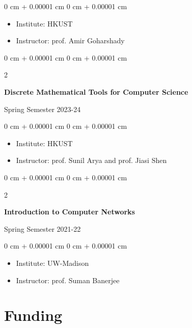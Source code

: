 \documentclass[10pt, letterpaper]{article}
\newenvironment{highlights}{
    \begin{itemize}[
        topsep=0.10 cm,
        parsep=0.10 cm,
        partopsep=0pt,
        itemsep=0pt,
        leftmargin=0 cm + 10pt
    ]
}{
    \end{itemize}
} %
\newenvironment{onecolentry}{
    \begin{adjustwidth}{
        0 cm + 0.00001 cm
    }{
        0 cm + 0.00001 cm
    }
}{
    \end{adjustwidth}
} %
\newenvironment{twocolentry}[2][]{
    \onecolentry
    \def\secondColumn{#2}
    \setcolumnwidth{\fill, 4.5 cm}
    \begin{paracol}{2}
}{
    \switchcolumn \raggedleft \secondColumn
    \end{paracol}
    \endonecolentry
} %
\begin{document}
            \vspace{0.10 cm}
            
            \begin{onecolentry}
            \begin{highlights}
                \item Institute: HKUST
                \item Instructor: prof. Amir Goharshady
            \end{highlights}
        \end{onecolentry}

        \begin{twocolentry}{
                Spring Semester 2023-24
            }
                \textbf{Discrete Mathematical Tools for Computer Science}
            \end{twocolentry}

            \vspace{0.10 cm}
            
            \begin{onecolentry}
            \begin{highlights}
                \item Institute: HKUST
                \item Instructor: prof. Sunil Arya and prof. Jiasi Shen
            \end{highlights}
        \end{onecolentry}

        \begin{twocolentry}{
                Spring Semester 2021-22
            }
                \textbf{Introduction to Computer Networks}
            \end{twocolentry}

            \vspace{0.10 cm}
            
            \begin{onecolentry}
            \begin{highlights}
                \item Institute: UW-Madison
                \item Instructor: prof. Suman Banerjee
            \end{highlights}
        \end{onecolentry}

    \section {Funding}
\end{document}
